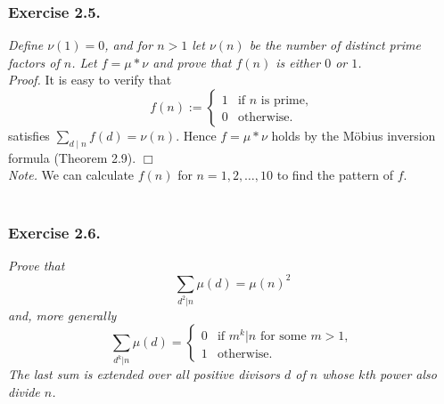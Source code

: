 \documentclass{article}
\begin{document}



\subsubsection*{Exercise 2.5.}
\emph{Define $\nu(1) = 0$,
and for $n > 1$ let $\nu(n)$ be the number of distinct prime factors of $n$.
Let $f = \mu * \nu$ and prove that $f(n)$ is either $0$ or $1$.} \\



\emph{Proof.}
  It is easy to verify that
  \begin{equation*}
    f(n) :=
    \begin{cases}
      1 & \text{if $n$ is prime}, \\
      0 & \text{otherwise}.
    \end{cases}
  \end{equation*}
  satisfies $\sum_{d \mid n} f(d) = \nu(n)$.
  Hence $f = \mu * \nu$ holds by the M\"obius inversion formula (Theorem 2.9).
$\Box$ \\



\emph{Note.}
We can calculate $f(n)$ for $n = 1, 2, \ldots, 10$ to find the pattern of $f$. \\\\






\subsubsection*{Exercise 2.6.}
\emph{Prove that
\[
  \sum_{d^2 | n} \mu(d) = \mu(n)^2
\]
and, more generally
\begin{equation*}
  \sum_{d^k | n} \mu(d) =
  \begin{cases}
    0 & \text{if $m^k | n$ for some $m > 1$}, \\
    1 & \text{otherwise}.
  \end{cases}
\end{equation*}
The last sum is extended over all positive divisors $d$ of $n$
whose $k$th power also divide $n$.} \\
\end{document}
